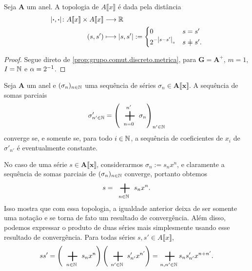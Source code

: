 \begin{proposition}
Seja $\bm A$ um anel. A topologia de $A\llbracket x \rrbracket$ é dada pela distância
	\begin{align*}
	\func{\dist{\var}{\var}}{A\llbracket x \rrbracket \times A\llbracket x \rrbracket}{\R}{(s,s')}{
		\dist{s}{s'} :=
			\begin{cases}
				0					& s=s' \\
				2^{-\ords{s-s'}}	& s \neq s'.
			\end{cases}
	}
	\end{align*}
\end{proposition}
\begin{proof}
Segue direto de \ref{prop:grupo.comut.discreto.metrica}, para $\bm G = \bm{A^+}$, $m = 1$, $I = \mathbb{N}$ e $\alpha = 2^{-1}$.
\end{proof}

\begin{exercise}
Seja $\bm A$ um anel e $(\sigma_n)_{n \in \mathbb{N}}$ uma sequência de séries $\sigma_n \in \bm{A\llbracket x \rrbracket}$. A sequência de somas parciais
	\begin{equation*}
	\sigma'_{n' \in \N} = \left( \sum_{n=0}^{n'} \sigma_n \right)_{n' \in \N}
	\end{equation*}
converge se, e somente se, para todo $i \in \mathbb{N}$, a sequência de coeficientes de $x_i$ de $\sigma'_{n'}$ é eventualmente constante.
\end{exercise}

No caso de uma série $s \in \bm{A\llbracket x \rrbracket}$, considerarmos $\sigma_n := s_nx^n$, e claramente a sequência de somas parciais de $(\sigma_n)_{n \in \mathbb{N}}$ converge, portanto obtemos
	\begin{equation*}
	s = \sum_{n \in \N} s_nx^n.
	\end{equation*}
Isso mostra que com essa topologia, a igualdade anterior deixa de ser somente uma notação e se torna de fato um resultado de convergência. Além disso, podemos expressar o produto de duas séries mais simplesmente usando esse resultado de convergência. Para todas séries $s,s' \in A\llbracket x \rrbracket$,
	\begin{equation*}
	ss' = \left( \sum_{n \in \N} s_nx^n \right) \left( \sum_{n' \in \N} s'_{n'}x^{n'} \right) = \sum_{n,n' \in \N} s_ns'_{n'}x^{n+n'}.
	\end{equation*}


\cleardoublepage





